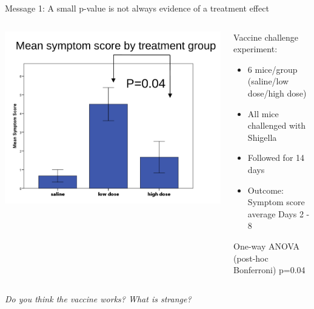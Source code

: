 \documentclass{beamer}
\begin{document}
\begin{frame}{Message 1: A small p-value is not always evidence of a treatment effect}

  \begin{columns}
    \begin{column}{0.5\textwidth}
	\begin{center}
	\includegraphics[width=\textwidth]{Figures/message1}
	\end{center}
    \end{column}
    
    \begin{column}{0.5\textwidth}
    \begin{block}{Vaccine challenge experiment:}
      \begin{itemize} 
       \item 6 mice/group (saline/low dose/high dose)
       \item All mice challenged with Shigella
       \item Followed for 14 days
       \item  Outcome: Symptom score average Days 2 - 8
      \end{itemize}
      \end{block}
      
      \begin{alertblock}{}
       One-way ANOVA (post-hoc Bonferroni) p=0.04
      \end{alertblock}

    \end{column}
  \end{columns}
  
  \pause \vspace{0.3cm}
  \emph{\large Do you think the vaccine works? What is strange?}
  

\end{frame}
\end{document}
